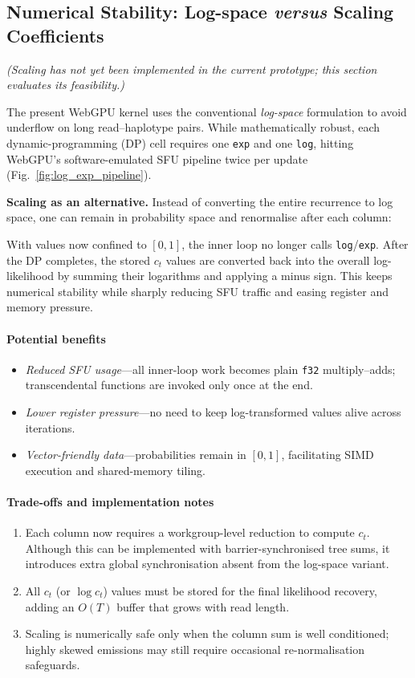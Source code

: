 \documentclass[PhD]{PHlab-thesis}
\begin{document}
\subsection{Numerical Stability: Log-space \emph{versus} Scaling Coefficients}

\textit{(Scaling has not yet been implemented in the current prototype; this section evaluates its feasibility.)}

The present WebGPU kernel uses the conventional \emph{log-space} formulation to avoid underflow on long read–haplotype pairs.  
While mathematically robust, each dynamic-programming (DP) cell requires one \texttt{exp} and one \texttt{log}, hitting WebGPU’s software-emulated SFU pipeline twice per update (Fig.~\ref{fig:log_exp_pipeline}).

\vspace{0.4em}
\noindent\textbf{Scaling as an alternative.}\;
Instead of converting the entire recurrence to log space, one can remain in probability space and renormalise after each column:


With values now confined to $[0,1]$, the inner loop no longer calls \texttt{log}/\texttt{exp}.  
After the DP completes, the stored $c_{t}$ values are converted back into the overall log-likelihood by summing their logarithms and applying a minus sign.  
This keeps numerical stability while sharply reducing SFU traffic and easing register and memory pressure.

\paragraph{Potential benefits}
\begin{itemize}
  \item \emph{Reduced SFU usage}—all inner-loop work becomes plain \texttt{f32} multiply–adds; transcendental functions are invoked only once at the end.
  \item \emph{Lower register pressure}—no need to keep log-transformed values alive across iterations.
  \item \emph{Vector-friendly data}—probabilities remain in $[0,1]$, facilitating SIMD execution and shared-memory tiling.
\end{itemize}

\paragraph{Trade-offs and implementation notes}
\begin{enumerate}
  \item Each column now requires a workgroup-level reduction to compute $c_{t}$.  
        Although this can be implemented with barrier-synchronised tree sums, it introduces extra global synchronisation absent from the log-space variant.
  \item All $c_{t}$ (or $\log c_{t}$) values must be stored for the final likelihood recovery, adding an $O(T)$ buffer that grows with read length.
  \item Scaling is numerically safe only when the column sum is well conditioned; highly skewed emissions may still require occasional re-normalisation safeguards.
\end{enumerate}
\end{document}
